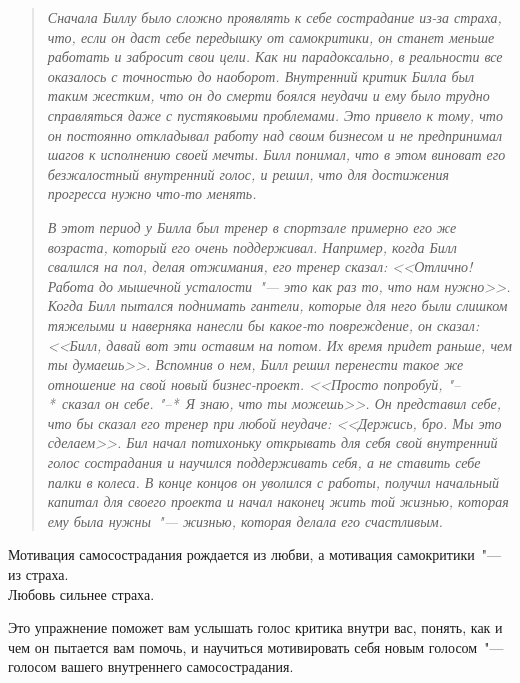 \begin{quotation}
	\textit{
		Сначала Биллу было сложно проявлять к себе сострадание из-за страха, что, если он даст себе передышку от самокритики, он станет меньше работать и забросит свои цели. Как ни парадоксально, в реальности все оказалось с точностью до наоборот. Внутренний критик Билла был таким жестким, что он до смерти боялся неудачи и ему было трудно справляться даже с пустяковыми проблемами. Это привело к тому, что он постоянно откладывал работу над своим бизнесом и не предпринимал шагов к исполнению своей мечты. Билл понимал, что в этом виноват его безжалостный внутренний голос, и решил, что для достижения прогресса нужно что-то менять.
	}
	
	\textit{
		В этот период у Билла был тренер в спортзале примерно его же возраста, который его очень поддерживал. Например, когда Билл свалился на пол, делая отжимания, его тренер сказал: <<Отлично! Работа до мышечной усталости~"--- это как раз то, что нам нужно>>. Когда Билл пытался поднимать гантели, которые для него были слишком тяжелыми и наверняка нанесли бы какое-то повреждение, он сказал: <<Билл, давай вот эти оставим на потом. Их время придет раньше, чем ты думаешь>>. Вспомнив о нем, Билл решил перенести такое же отношение на свой новый бизнес-проект. <<Просто попробуй, "--*~сказал он себе. "--*~Я знаю, что ты можешь>>. Он представил себе, что бы сказал его тренер при любой неудаче: <<Держись, бро. Мы это сделаем>>. Бил начал потихоньку открывать для себя свой внутренний голос сострадания и научился поддерживать себя, а не ставить себе палки в колеса. В конце концов он уволился с работы, получил начальный капитал для своего проекта и начал наконец жить той жизнью, которая ему была нужны~"--- жизнью, которая делала его счастливым.
	}
\end{quotation}

\vspace{3ex}

\begin{center}
	{\LARGE Мотивация самосострадания рождается из любви, а мотивация самокритики~"--- из страха.
	\\
	\vspace{1ex}
	Любовь сильнее страха.}
\end{center}

\newpage
{} \label{EX:Finding_Your_Compassionate_Voice}

Это упражнение поможет вам услышать голос критика внутри вас, понять, как и чем он пытается вам помочь, и научиться мотивировать себя новым голосом~"--- голосом вашего внутреннего самосострадания. 

